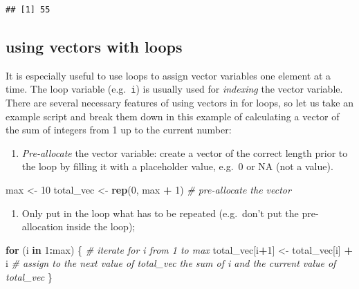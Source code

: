 \documentclass[
]{book}
\newenvironment{Shaded}{\begin{snugshade}}{\end{snugshade}}
\newcommand{\CommentTok}[1]{\textcolor[rgb]{0.56,0.35,0.01}{\textit{#1}}}
\newcommand{\ControlFlowTok}[1]{\textcolor[rgb]{0.13,0.29,0.53}{\textbf{#1}}}
\newcommand{\DecValTok}[1]{\textcolor[rgb]{0.00,0.00,0.81}{#1}}
\newcommand{\KeywordTok}[1]{\textcolor[rgb]{0.13,0.29,0.53}{\textbf{#1}}}
\newcommand{\NormalTok}[1]{#1}
\newcommand{\OperatorTok}[1]{\textcolor[rgb]{0.81,0.36,0.00}{\textbf{#1}}}
\newcommand{\StringTok}[1]{\textcolor[rgb]{0.31,0.60,0.02}{#1}}
\providecommand{\tightlist}{%
  \setlength{\itemsep}{0pt}\setlength{\parskip}{0pt}}
\theoremstyle{definition}
\theoremstyle{definition}
\theoremstyle{definition}
\theoremstyle{remark}
\begin{document}
\begin{verbatim}
## [1] 55
\end{verbatim}

\hypertarget{using-vectors-with-loops}{%
\subsection{using vectors with loops}\label{using-vectors-with-loops}}

It is especially useful to use loops to assign vector variables one element at a time. The loop variable (e.g.~\texttt{i}) is usually used for \emph{indexing} the vector variable. There are several necessary features of using vectors in for loops, so let us take an example script and break them down in this example of calculating a vector of the sum of integers from 1 up to the current number:

\begin{enumerate}
\def\labelenumi{\arabic{enumi}.}
\tightlist
\item
  \emph{Pre-allocate} the vector variable: create a vector of the correct length prior to the loop by filling it with a placeholder value, e.g.~0 or NA (not a value).
\end{enumerate}

\begin{Shaded}
\begin{Highlighting}[]
\NormalTok{max \textless{}{-}}\StringTok{ }\DecValTok{10}
\NormalTok{total\_vec \textless{}{-}}\StringTok{ }\KeywordTok{rep}\NormalTok{(}\DecValTok{0}\NormalTok{, max }\OperatorTok{+}\StringTok{ }\DecValTok{1}\NormalTok{)  }\CommentTok{\# pre{-}allocate the vector}
\end{Highlighting}
\end{Shaded}

\begin{enumerate}
\def\labelenumi{\arabic{enumi}.}
\setcounter{enumi}{1}
\tightlist
\item
  Only put in the loop what has to be repeated (e.g.~don't put the pre-allocation inside the loop);
\end{enumerate}

\begin{Shaded}
\begin{Highlighting}[]
\ControlFlowTok{for}\NormalTok{ (i }\ControlFlowTok{in} \DecValTok{1}\OperatorTok{:}\NormalTok{max) \{ }\CommentTok{\# iterate for i from 1 to max}
\NormalTok{  total\_vec[i}\OperatorTok{+}\DecValTok{1}\NormalTok{] \textless{}{-}}\StringTok{ }\NormalTok{total\_vec[i] }\OperatorTok{+}\StringTok{ }\NormalTok{i }\CommentTok{\# assign to the next value of total\_vec the sum of i and the current value of total\_vec}
\NormalTok{\}}
\end{Highlighting}
\end{Shaded}
\end{document}
